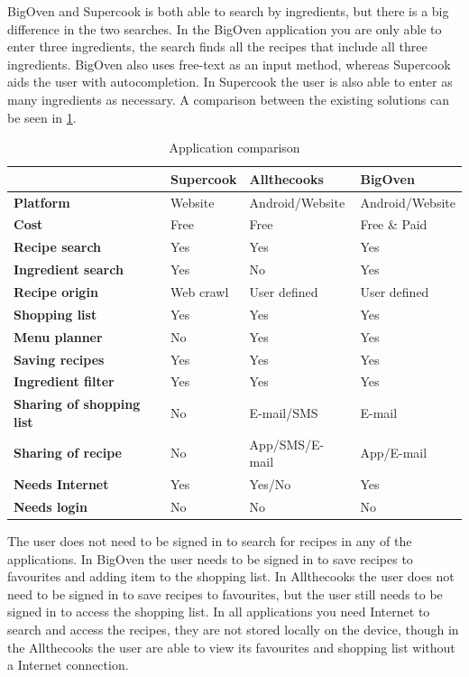 BigOven and Supercook is both able to search by ingredients, but there is a big difference in the two searches. In the BigOven application you are only able to enter three ingredients, the search finds all the recipes that include all three ingredients. BigOven also uses free-text as an input method, whereas Supercook aids the user with autocompletion. In Supercook the user is also able to enter as many ingredients as necessary.
A comparison between the existing solutions can be seen in \ref{tab:appcomparison}.
\begin{table}[H]
\centering
\begin{tabular}{|>{\bfseries}l|l|l|l|}
\hline
 & \textbf{Supercook} & \textbf{Allthecooks} & \textbf{BigOven} \\
\hline
Platform & Website & Android/Website & Android/Website \\
\hline
Cost & Free & Free & Free \& Paid \\
\hline
Recipe search & Yes & Yes & Yes  \\
\hline
Ingredient search & Yes & No & Yes \\
\hline
Recipe origin & Web crawl & User defined & User defined \\
\hline
Shopping list & Yes & Yes & Yes \\
\hline
Menu planner & No & Yes & Yes \\
\hline
Saving recipes & Yes & Yes & Yes \\
\hline
Ingredient filter & Yes & Yes & Yes \\
\hline
Sharing of shopping list & No & E-mail/SMS & E-mail \\
\hline
Sharing of recipe & No & App/SMS/E-mail & App/E-mail \\
\hline
Needs Internet & Yes & Yes/No & Yes \\
\hline
Needs login & No & No & No \\
\hline
\end{tabular}
\caption{Application comparison}
\label{tab:appcomparison}
\end{table}
The user does not need to be signed in to search for recipes in any of the applications. 
In BigOven the user needs to be signed in to save recipes to favourites and adding item to the shopping list. 
In Allthecooks the user does not need to be signed in to save recipes to favourites, but the user still needs to be signed in to access the shopping list.  
In all applications you need Internet to search and access the recipes, they are not stored locally on the device, though in the Allthecooks the user are able to view its favourites and shopping list without a Internet connection.

